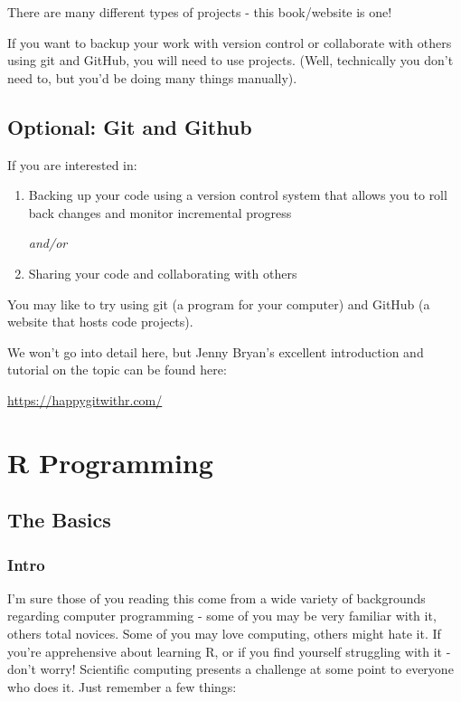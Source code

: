 \documentclass[
  letterpaper,
  DIV=11,
  numbers=noendperiod]{scrreprt}
\begin{document}
There are many different types of projects - this book/website is one!

If you want to backup your work with version control or collaborate with
others using git and GitHub, you will need to use projects. (Well,
technically you don't need to, but you'd be doing many things manually).

\chapter{Optional: Git and Github}\label{optional-git-and-github}

If you are interested in:

\begin{enumerate}
\def\labelenumi{\arabic{enumi}.}
\item
  Backing up your code using a version control system that allows you to
  roll back changes and monitor incremental progress

  \emph{and/or}
\item
  Sharing your code and collaborating with others
\end{enumerate}

You may like to try using git (a program for your computer) and GitHub
(a website that hosts code projects).

We won't go into detail here, but Jenny Bryan's excellent introduction
and tutorial on the topic can be found here:

\url{https://happygitwithr.com/}

\part{R Programming}

\chapter{The Basics}\label{the-basics}

\section{Intro}\label{intro}

I'm sure those of you reading this come from a wide variety of
backgrounds regarding computer programming - some of you may be very
familiar with it, others total novices. Some of you may love computing,
others might hate it. If you're apprehensive about learning R, or if you
find yourself struggling with it - don't worry! Scientific computing
presents a challenge at some point to everyone who does it. Just
remember a few things:
\end{document}
